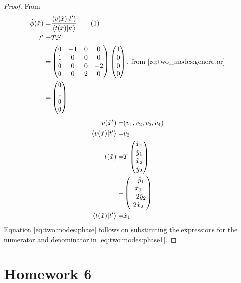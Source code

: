 \documentclass[]{article}
\newcommand\numberthis{\addtocounter{equation}{1}\tag{\theequation}}
\begin{document}
\begin{proof}
	From \cite[(13.8)]{ChaosBook}
	\begin{align*}
		\dot{\phi}(\hat{x}) =& \frac{\braket{v(\hat{x})\vert t^\prime}}{\braket{t(\hat{x})\vert t^\prime}}\numberthis \label{eq:two:modes:phase1}\\
		t^\prime =& T \hat{x}^\prime\\
		=& \begin{pmatrix}
			0&-1&0&0\\
			1&0&0&0\\
			0&0&0&-2\\
			0&0&2&0
		\end{pmatrix} \begin{pmatrix}
			1\\
			0\\
			0\\
			0
		\end{pmatrix}\text{, from \eqref{eq:two_modes:generator}}\\
		=& \begin{pmatrix}
				0\\
				1\\
				0\\
				0
		\end{pmatrix}
	\end{align*}
	\begin{align*}
		v(\hat{x}^\prime) =& (v_1, v_2, v_3, v_4)\\
		\braket{v(\hat{x})\vert t^\prime} =& v_2\\
		t(\hat{x}) =&  T \begin{pmatrix}
								\hat{x}_1\\
								\hat{y}_1\\
								\hat{x}_2\\
								\hat{y}_2
							\end{pmatrix}\\
			=& \begin{pmatrix}
				- \hat{y}_1\\
				\hat{x}_1\\
				-2 \hat{y}_2\\
				2\hat{x}_2
			\end{pmatrix}\\
		\braket{t(\hat{x})\vert t^\prime}=& \hat{x}_1
	\end{align*}
Equation \eqref{eq:two:modes:phase} follows on substituting the expressions for the numerator and denominator in \eqref{eq:two:modes:phase1}.
\end{proof}
\section{Homework 6}
\end{document}
